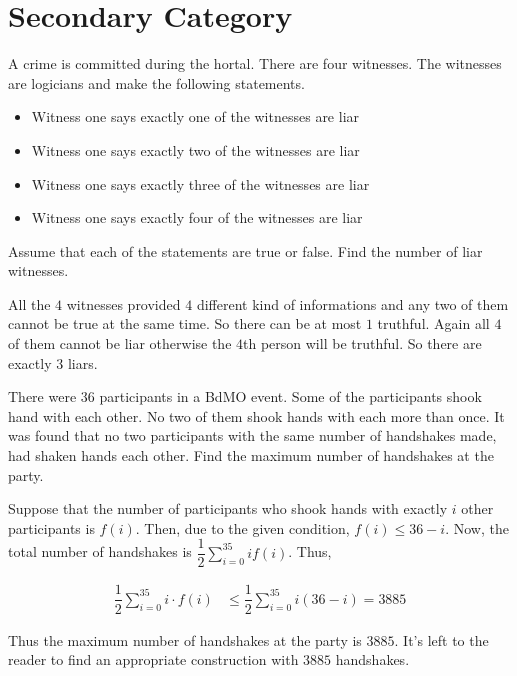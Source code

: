 \documentclass{subfile}
\begin{document}
	\section{Secondary Category}
	\begin{problem}
		A crime is committed during the hortal. There are four witnesses. The witnesses are logicians and make the following statements.
		\begin{itemize}
			\item Witness one says exactly one of the witnesses are liar
			\item Witness one says exactly two
			of the witnesses are liar
			\item Witness one says exactly three of the witnesses are liar
			\item Witness one says exactly four of the witnesses are liar
		\end{itemize}
		Assume that each of the statements are true or false. Find the number of liar witnesses.
	\end{problem}
		\begin{solution} All the $4$ witnesses provided $4$ different kind of informations and any two of them cannot be true at the same time. So there can be at most $1$ truthful. Again all $4$ of them cannot be liar otherwise the $4$th person will be truthful. So there are exactly $3$ liars.

		\end{solution}


		\begin{problem}\label{prb:1.3.2}
			There were $36$ participants in a BdMO event. Some of the participants shook hand with each other. No two of them shook hands with each more than once. It was found that no two participants with the same number of handshakes made, had shaken hands each other. Find the maximum number of handshakes at the party.
		\end{problem}

		\begin{solution}

			Suppose that the number of participants who shook hands with exactly $i$ other participants is $f(i)$. Then, due to the given condition, $f(i)\leq 36-i$. Now, the total number of handshakes is $\dfrac{1}{2}\sum\limits_{i=0}^{35}if(i)$. Thus,

			\begin{align*}
				\dfrac{1}{2}\sum\limits_{i=0}^{35} i\cdot f(i) & \leq \dfrac{1}{2}\sum\limits_{i=0}^{35}i(36-i)=3885
			\end{align*}

			Thus the maximum number of handshakes at the party is $3885$. It's left to the reader to find an appropriate construction with $3885$ handshakes.

		\end{solution}
\end{document}
